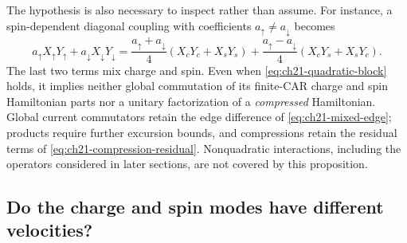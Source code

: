 The hypothesis is also necessary to inspect rather than assume.
For instance, a spin-dependent diagonal coupling with coefficients
$a_\uparrow\ne a_\downarrow$ becomes
\begin{equation}
 a_\uparrow X_\uparrow Y_\uparrow
 +a_\downarrow X_\downarrow Y_\downarrow
 =\frac{a_\uparrow+a_\downarrow}{4}(X_cY_c+X_sY_s)
  +\frac{a_\uparrow-a_\downarrow}{4}(X_cY_s+X_sY_c).
 \label{eq:ch21-asymmetry-mixes}
\end{equation}
The last two terms mix charge and spin.  Even when
\eqref{eq:ch21-quadratic-block} holds, it implies neither global
commutation of its finite-CAR charge and spin Hamiltonian parts nor a
unitary factorization of a \emph{compressed} Hamiltonian.  Global
current commutators retain the edge difference of
\eqref{eq:ch21-mixed-edge}; products require further excursion
bounds, and compressions retain the residual terms of
\eqref{eq:ch21-compression-residual}.  Nonquadratic interactions,
including the operators considered in later sections, are not
covered by this proposition.

\subsection*{Do the charge and spin modes have different velocities?}

